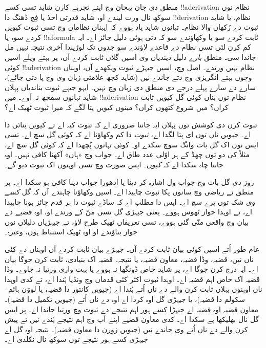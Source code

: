 \documentclass[../../../include/open-logic-section]{subfiles}
\begin{document}


منطق دی جان پہچان وچ اپنے تجربے کارن شاید تسی کسے !!a{derivation} نظام نوں سوکھ نال ورت لیندے او، شاید قدرتی اخذ یا فِچ ڈھنگ دا !!{derivation} نظام، یا شاید ثبوت دے رُکھاں والا نظام۔ تہانوں شاید یاد ہووے کہ ایہناں نظاماں وچ تسی ثبوت کیویں کردے سو، یا !!a{formula} ثابت کردے سو یا وکھاؤندے سو کہ دتی ہوئی دلیل جائز اے۔ ایہ کم کرن لئی تسی نظام دے قاعدے لاؤندے سو جدوں تک لوڑیندا آخری نتیجہ نہیں مل جاندا سی۔ منطق \emph{بارے} دلیل دیندیاں وی اسیں گلاں ثابت کردے آں، پر بہتے ویلے اسیں کوئی !!a{derivation} نظام نہیں ورتدے۔ اصل وچ، اسیں جیہڑے ثبوت ویکھدے آں، اوہناں وچوں بہتے انگریزی وچ دتے جاندے نیں (شاید کجھ علامتی زبان وی وچ پا دتی جائے)، سارے دے سارے پہلے درجے دی منطق دی زبان وچ نہیں۔ ایہو جیہے ثبوت بناندیاں پہلاں شاید تہانوں سمجھ نہ آوے۔ میں !!a{derivation} نظام توں بناں کوئی گل کیویں ثابت کراں؟ میں شروع کتھوں کراں؟ مینوں کیویں پتا لگے کہ میرا ثبوت ٹھیک اے؟

ثبوت کرن دی کوشش توں پہلاں ایہ جاننا ضروری اے کہ ثبوت کیہ اے تے کیویں بنائی دا اے۔ جیویں ناں توں ای پتا لگدا اے، \emph{ثبوت} دا کم وکھاؤنا اے کہ کوئی گل سچ اے۔ تسی ایس نوں اک گل بات وانگ سوچ سکدے او۔ کوئی تہانوں پُچھدا اے کہ کوئی گل سچ اے، مثلاً کی دو توں چھڈ کے ہر اوّلی عدد طاق اے۔ جواب وچ «ہاں» آکھنا کافی نہیں۔ اوہ جاننا چاہ سکدا اے کہ \emph{کیوں}۔ ایس صورت وچ تسی اوہنوں اک ثبوت دیو گے۔

روز دی گل بات وچ جواب ول اشارہ کر دینا یا ادھورا جواب دینا کافی ہو سکدا اے۔ پر منطق تے ریاضی وچ سانوں پکا ثبوت چاہیدا اے۔ اسیں وکھاؤنا چاہندے آں کہ گل \emph{کسے وی} شک توں پرے سچ اے۔ ایس دا مطلب اے کہ ساڈے ثبوت دا ہر قدم جائز ہونا چاہیدا اے، تے اوہدا جواز ٹھوس ہووے۔ یعنی جیہڑی گل تسی منّ کے ورتدے او، اوہ قضیے دے بیان وچ واقعی منّی گئی ہووے، تسی تعریفاں ٹھیک طرح لاؤ، تے جیہڑیاں دلیلاں نوں جواز بناؤندے او اوہ ٹھیک استنباط ہون، وغیرہ۔

عام طور اُتے اسیں کوئی بیان ثابت کردے آں۔ جیہڑے بیان ثابت کردے آں اوہناں دے کئی ناں نیں، قضیہ، وڈا قضیہ، معاون قضیہ، یا نتیجہ۔ قضیہ اک بنیادی، ثابت کرن جوگا بیان اے۔ ایہ درج کرن جوگا اے، پر شاید خاص ڈونگھا نہ ہووے یا بہت واری ورتیا نہ جاوے۔ وڈا قضیہ اک خاص اہم قضیہ اے۔ اوہدا ثبوت اکثر کئی قدماں وچ ونڈیا ہُندا اے، تے کدی اوہدا ناں اوہنوں پہلاں ثابت کرن والے دے ناں اُتے ہُندا اے (جیویں کانتور دا قضیہ، یا لووَن ہائم–سکولم دا قضیہ)، یا جیہڑی گل اوہ کردا اے اوہ دے ناں اُتے (جیویں تکمیل دا قضیہ)۔ معاون قضیہ اوہ قضیہ اے جیہڑا کسے ہور اہم نتیجے دے ثبوت وچ ورتیا جاندا اے۔ پر ایس گل نال بھلیکھا پے سکدا اے۔ کدی معاون قضیے اپنے آپ وچ اہم نتیجے ہُندے نیں تے پیش کرن والے دے ناں اُتے وی جاندے نیں (جیویں زورن دا معاون قضیہ)۔ نتیجہ اوہ گل اے جیہڑی کسے ہور نتیجے توں سوکھ نال نکلدی اے۔
\end{document}

